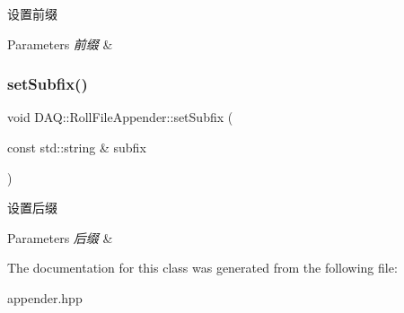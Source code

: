 设置前缀 


\begin{DoxyParams}{Parameters}
{\em 前缀} & \\
\hline
\end{DoxyParams}
\mbox{\label{classDAQ_1_1RollFileAppender_a15303e8f223e7b279f0a3cd97e699e2e}} 
\subsubsection{\texorpdfstring{set\+Subfix()}{setSubfix()}}
{\footnotesize\ttfamily void D\+A\+Q\+::\+Roll\+File\+Appender\+::set\+Subfix (\begin{DoxyParamCaption}\item[{const std\+::string \&}]{subfix }\end{DoxyParamCaption})\hspace{0.3cm}{\ttfamily [inline]}}



设置后缀 


\begin{DoxyParams}{Parameters}
{\em 后缀} & \\
\hline
\end{DoxyParams}


The documentation for this class was generated from the following file\+:\begin{DoxyCompactItemize}
\item 
appender.\+hpp\end{DoxyCompactItemize}
